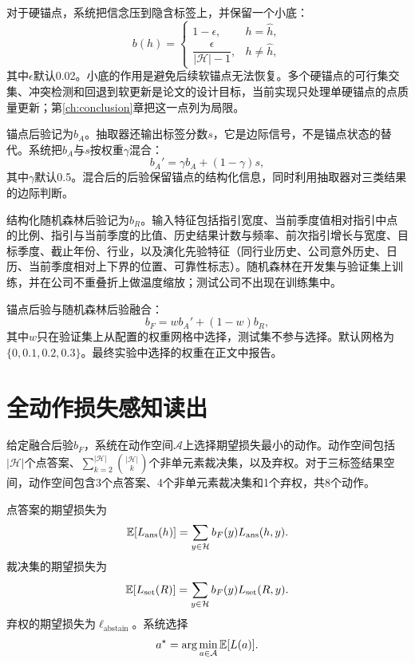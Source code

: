 对于硬锚点，系统把信念压到隐含标签上，并保留一个小底：
\begin{equation}
b(h)=
\begin{cases}
1-\epsilon, & h=\hat h,\\
\dfrac{\epsilon}{|\mathcal H|-1}, & h\ne\hat h,
\end{cases}
\label{eq:hardupdate}
\end{equation}
其中$\epsilon$默认0.02。小底的作用是避免后续软锚点无法恢复。多个硬锚点的可行集交集、冲突检测和回退到软更新是论文的设计目标，当前实现只处理单硬锚点的点质量更新；第\ref{ch:conclusion}章把这一点列为局限。

锚点后验记为$b_A$。抽取器还输出标签分数$s$，它是边际信号，不是锚点状态的替代。系统把$b_A$与$s$按权重$\gamma$混合：
\begin{equation}
b_A'=\gamma b_A+(1-\gamma)s,
\label{eq:blend}
\end{equation}
其中$\gamma$默认0.5。混合后的后验保留锚点的结构化信息，同时利用抽取器对三类结果的边际判断。

结构化随机森林后验记为$b_R$。输入特征包括指引宽度、当前季度值相对指引中点的比例、指引与当前季度的比值、历史结果计数与频率、前次指引增长与宽度、目标季度、截止年份、行业，以及演化先验特征（同行业历史、公司意外历史、日历、当前季度相对上下界的位置、可靠性标志）。随机森林在开发集与验证集上训练，并在公司不重叠折上做温度缩放；测试公司不出现在训练集中。

锚点后验与随机森林后验融合：
\begin{equation}
b_F=w b_A'+(1-w)b_R,
\label{eq:fusion}
\end{equation}
其中$w$只在验证集上从配置的权重网格中选择，测试集不参与选择。默认网格为$\{0,0.1,0.2,0.3\}$。最终实验中选择的权重在正文中报告。

\section{全动作损失感知读出}

给定融合后验$b_F$，系统在动作空间$\mathcal A$上选择期望损失最小的动作。动作空间包括$|\mathcal H|$个点答案、$\sum_{k=2}^{|\mathcal H|}\binom{|\mathcal H|}{k}$个非单元素裁决集，以及弃权。对于三标签结果空间，动作空间包含3个点答案、4个非单元素裁决集和1个弃权，共8个动作。

点答案的期望损失为
\begin{equation}
\mathbb{E}[L_{\text{ans}}(h)]=\sum_{y\in\mathcal H}b_F(y)L_{\text{ans}}(h,y).
\label{eq:eans}
\end{equation}
裁决集的期望损失为
\begin{equation}
\mathbb{E}[L_{\text{set}}(R)]=\sum_{y\in\mathcal H}b_F(y)L_{\text{set}}(R,y).
\label{eq:eset}
\end{equation}
弃权的期望损失为$\ell_{\text{abstain}}$。系统选择
\begin{equation}
a^\star=\arg\min_{a\in\mathcal A}\mathbb{E}[L(a)].
\label{eq:fullaction}
\end{equation}

